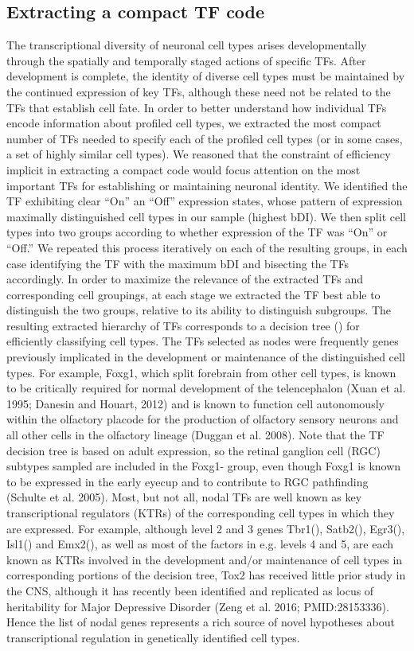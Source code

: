 \subsection{Extracting a compact TF code}
The transcriptional diversity of neuronal cell types arises developmentally through the spatially and temporally staged actions of specific TFs. After development is complete, the identity of diverse cell types must be maintained by the continued expression of key TFs, although these need not be related to the TFs that establish cell fate. In order to better understand how individual TFs encode information about profiled cell types, we extracted the most compact number of TFs needed to specify each of the profiled cell types (or in some cases, a set of highly similar cell types). We reasoned that the constraint of efficiency implicit in extracting a compact code would focus attention on the most important TFs for establishing or maintaining neuronal identity. We identified the TF exhibiting clear “On” an “Off” expression states, whose pattern of expression maximally distinguished cell types in our sample (highest bDI). We then split cell types into two groups according to whether expression of the TF was “On” or “Off.” We repeated this process iteratively on each of the resulting groups, in each case identifying the TF with the maximum bDI and bisecting the TFs accordingly. In order to maximize the relevance of the extracted TFs and corresponding cell groupings, at each stage we extracted the TF best able to distinguish the two groups, relative to its ability to distinguish subgroups. The resulting extracted hierarchy of TFs corresponds to a decision tree () for efficiently classifying cell types. 
The TFs selected as nodes were frequently genes previously implicated in the development or maintenance of the distinguished cell types. For example, Foxg1, which split forebrain from other cell types, is known to be critically required for normal development of the telencephalon (Xuan et al. 1995; Danesin and Houart, 2012) and is known to function cell autonomously within the olfactory placode for the production of olfactory sensory neurons and all other cells in the olfactory lineage (Duggan et al. 2008). Note that the TF decision tree is based on adult expression, so the retinal ganglion cell (RGC) subtypes sampled are included in the Foxg1- group, even though Foxg1 is known to be expressed in the early eyecup and to contribute to RGC pathfinding (Schulte et al. 2005).
Most, but not all, nodal TFs are well known as key transcriptional regulators (KTRs) of the corresponding cell types in which they are expressed. For example, although level 2 and 3 genes Tbr1(), Satb2(), Egr3(), Isl1() and Emx2(), as well as most of the factors in e.g. levels 4 and 5, are each known as KTRs involved in the development and/or maintenance of cell types in corresponding portions of the decision tree, Tox2 has received little prior study in the CNS, although it has recently been identified and replicated as locus of heritability for Major Depressive Disorder (Zeng et al. 2016; PMID:28153336). Hence the list of nodal genes represents a rich source of novel hypotheses about transcriptional regulation in genetically identified cell types. 
